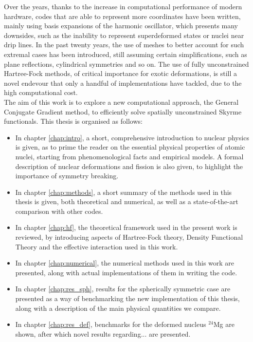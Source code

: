 Over the years, thanks to the increase in computational performance of modern hardware, codes that are able to represent more coordinates have been written, mainly using basis expansions of the harmonic oscillator, which presents many downsides, such as the inability to represent superdeformed states or nuclei near drip lines.
In the past twenty years, the use of meshes to better account for such extremal cases has been introduced, still assuming certain simplifications, such as plane reflections, cylindrical symmetries and so on. The use of fully unconstrained Hartree-Fock methods, of critical importance for exotic deformations, is still a novel endevour that only a handful of implementations have tackled, due to the high computational cost.
\\The aim of this work is to explore a new computational approach, the General Conjugate Gradient method, to efficiently solve spatially unconstrained Skyrme functionals. This thesis is organised as follows:
\begin{itemize}
    \item In chapter \ref{chap:intro}, a short, comprehensive introduction to nuclear physics is given, as to prime the reader on the essential physical properties of atomic nuclei, starting from phenomenological facts and empirical models. A formal description of nuclear deformations and fission is also given, to highlight the importance of symmetry breaking.
    \item In chapter \ref{chap:methods}, a short summary of the methods used in this thesis is given, both theoretical and numerical, as well as a state-of-the-art comparison with other codes.
    \item In chapter \ref{chap:hf}, the theoretical framework used in the present work is reviewed, by introducing aspects of Hartree-Fock theory, Density Functional Theory and the effective interaction used in this work.
    \item In chapter \ref{chap:numerical}, the numerical methods used in this work are presented, along with actual implementations of them in writing the code.
    \item In chapter \ref{chap:res_sph}, results for the spherically symmetric case are presented as a way of benchmarking the new implementation of this thesis, along with a description of the main physical quantities we compare.
    \item In chapter \ref{chap:res_def}, benchmarks for the deformed nucleus $^{24}$Mg are shown, after which novel results regarding... are presented.
\end{itemize}
